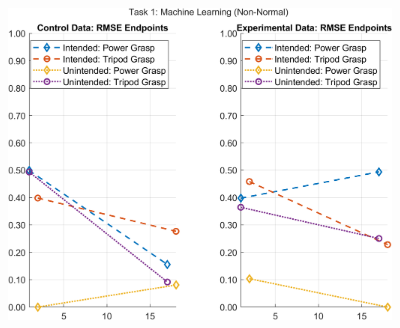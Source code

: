 \documentclass[12pt]{article}
\newcommand\figWidth{4in}
\begin{document}
    \begin{figure}
        \includegraphics[width = \figWidth]{t1-spaghetti-xnorm.png}
    \end{figure}
\end{document}
